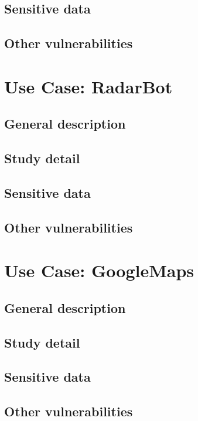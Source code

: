 		\subsection{Sensitive data}
		\subsection{Other vulnerabilities}

	\section{Use Case: RadarBot}
		\subsection{General description}
		\subsection{Study detail}
		\subsection{Sensitive data}
		\subsection{Other vulnerabilities}

	\section{Use Case: GoogleMaps}
		\subsection{General description}
		\subsection{Study detail}
		\subsection{Sensitive data}
		\subsection{Other vulnerabilities}